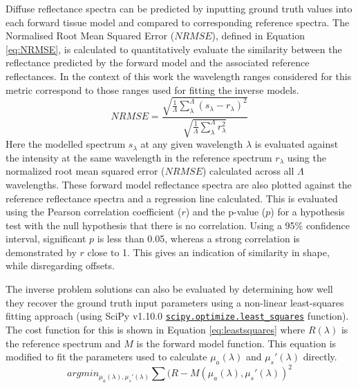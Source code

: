 Diffuse reflectance spectra can be predicted by inputting ground truth values into each forward tissue model and compared to corresponding reference spectra. The Normalised Root Mean Squared Error ($NRMSE$), defined in Equation \eqref{eq:NRMSE}, is calculated to quantitatively evaluate the similarity between the reflectance predicted by the forward model and the associated reference reflectances. In the context of this work the wavelength ranges considered for this metric correspond to those ranges used for fitting the inverse models.
\begin{equation}
    NRMSE = \frac{\sqrt{\frac{1}{\Lambda}\sum_{\lambda}^{\Lambda}\left(s_{\lambda} - r_{\lambda}\right)^2}}{\sqrt{\frac{1}{\Lambda}\sum_{\lambda}^{\Lambda} r^2_{\lambda}}}
    \label{eq:NRMSE}
\end{equation}
Here the modelled spectrum $s_{\lambda}$ at any given wavelength $\lambda$ is evaluated against the intensity at the same wavelength in the reference spectrum $r_{\lambda}$ using the normalized root mean squared error ($NRMSE$) calculated across all $\Lambda$ wavelengths. These forward model reflectance spectra are also plotted against the reference reflectance spectra and a regression line calculated. This is evaluated using the Pearson correlation coefficient ($r$) and the p-value ($p$) for a hypothesis test with the null hypothesis that there is no correlation. Using a 95\% confidence interval, significant $p$ is less than 0.05, whereas a strong correlation is demonstrated by $r$ close to 1.  This gives an indication of similarity in shape, while disregarding offsets.

The inverse problem solutions can also be evaluated by determining how well they recover the ground truth input parameters using a non-linear least-squares fitting approach (using SciPy v1.10.0 \href{https://docs.scipy.org/doc/scipy/reference/generated/scipy.optimize.least_squares.html}{\texttt{scipy.optimize.least\_squares}} function). The cost function for this is shown in Equation \eqref{eq:leastsquares} where $R(\lambda)$ is the reference spectrum and $M$ is the forward model function. This equation is modified to fit the parameters used to calculate $\mu_a(\lambda)$ and $\mu_s'(\lambda)$ directly.
\begin{equation}
    argmin_{\mu_{a}(\lambda), \mu_{s}'(\lambda)} \sum (R - M(\mu_{a}(\lambda), \mu_s'(\lambda))^2
    \label{eq:leastsquares}
\end{equation}


